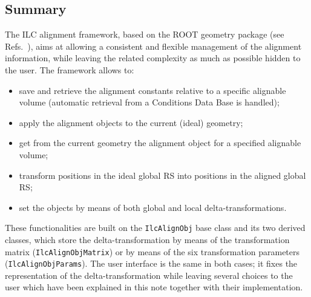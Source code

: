 \documentclass[12pt,a4paper,twoside]{article}
\makeatletter
\newcommand {\ROOT} {ROOT\@\xspace}
\newcommand{\FR}{ILC alignment framework}
\makeatother
\begin{document}
{\subsection{Summary}
\label{sec:Summary}

The \FR, based on the \ROOT geometry package (see
Refs.~\cite{rootUG,tgeo}), aims at allowing a consistent and flexible
management of the alignment information, while leaving the related
complexity as much as possible hidden to the user.  The framework
allows to:
\begin{itemize}
  \item save and retrieve the alignment constants relative
  to a specific alignable volume (automatic retrieval from a
  Conditions Data Base is handled);
  \item apply the alignment objects to the
  current (ideal) geometry;
  \item get from the current geometry the
  alignment object for a specified alignable volume;
  \item transform positions in the ideal global
  RS into positions in the aligned global RS;
  \item set the objects by means of both global and local
  delta-transformations. 
\end{itemize}
These functionalities are built on the \lstinline!IlcAlignObj! base
class and its two derived classes, which store the
delta-transformation by means of the transformation matrix
(\lstinline!IlcAlignObjMatrix!) or by means of the six transformation
parameters (\lstinline!IlcAlignObjParams!). The user interface is the
same in both cases; it fixes the representation of the
delta-transformation while leaving several choices to the user which
have been explained in this note together with their implementation.

}
\end{document}
